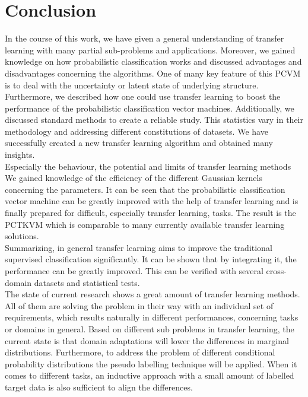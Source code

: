 \chapter{Conclusion}\label{ConChap}	
In the course of this work, we have given a general understanding of transfer learning with many partial sub-problems and applications.
Moreover, we gained knowledge on how probabilistic classification works and discussed advantages and disadvantages concerning the algorithms.
One of many key feature of this \acs{PCVM} is to deal with the uncertainty or latent state of underlying structure.\\
Furthermore, we described how one could use transfer learning to boost the performance of the probabilistic classification vector machines.
Additionally, we discussed standard methods to create a reliable study.
This statistics vary in their methodology and addressing different constitutions of datasets.
We have successfully created a new transfer learning algorithm and obtained many insights.\\
Especially the behaviour, the potential and limits of transfer learning methods
We gained knowledge of the efficiency of the different Gaussian kernels concerning the parameters.
It can be seen that the probabilistic classification vector machine can be greatly improved with the help of transfer learning and is finally prepared for difficult, especially transfer learning, tasks.
The result is the \acl{PCTKVM} which is comparable to many currently available transfer learning solutions.\\ 
Summarizing, in general transfer learning aims to improve the traditional supervised classification significantly.
It can be shown that by integrating it, the performance can be greatly improved.
This can be verified with several cross-domain datasets and statistical tests.\\
The state of current research shows a great amount of transfer learning methods.\cite[p. 33]{Weiss.2016}
All of them are solving the problem in their way with an individual set of requirements, which results naturally in different performances, concerning tasks or domains in general.
Based on different sub problems in transfer learning, the current state is that domain adaptations will lower the differences in marginal distributions. Furthermore, to address the problem of different conditional probability distributions the pseudo labelling technique will be applied. When it comes to different tasks, an inductive approach with a small amount of labelled target data is also sufficient to align the differences.
